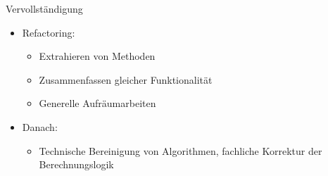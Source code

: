 \begin{frame}[fragile]{Vervollständigung}

\begin{itemize}
\item Refactoring: 
\begin{itemize}
\item Extrahieren von Methoden
\item Zusammenfassen gleicher Funktionalität
\item Generelle Aufräumarbeiten
\end{itemize}
\end{itemize}

\begin{itemize}
\item Danach: 
\begin{itemize}
\item Technische Bereinigung von Algorithmen, fachliche Korrektur der Berechnungslogik
\end{itemize}
\end{itemize}

\end{frame}

